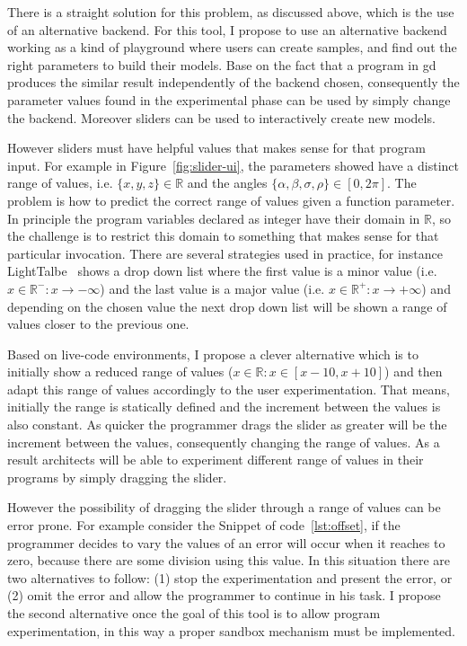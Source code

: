 There is a straight solution for this problem, as discussed above, which is the use of an alternative backend. For this tool, I propose to use an alternative backend working as a kind of playground where users can create samples, and find out the right parameters to build their models. Base on the fact that a program in \gls{gd} produces the similar result independently of the backend chosen, consequently the parameter values found in the experimental phase can be used by simply change the backend. Moreover sliders can be used to interactively create new models.

However sliders must have helpful values that makes sense for that program input. For example in Figure~\ref{fig:slider-ui}, the parameters showed have a distinct range of values, i.e. $\{x,y,z\} \in \mathds{R}$ and the angles $\{\alpha,\beta, \sigma, \rho \} \in [0, 2 \pi]$. The problem is how to predict the correct range of values given a function parameter. In principle the program variables declared as integer have their domain in $\mathds{R}$, so the challenge is to restrict this domain to something that makes sense for that particular invocation. There are several strategies used in practice, for instance LightTalbe~\citep{lighttable} shows a drop down list where the first value is a minor value (i.e. $x \in \mathds{R}^- : x \rightarrow - \infty$) and the last value is a major value (i.e. $x \in \mathds{R}^+ : x \rightarrow + \infty$) and depending on the chosen value the next drop down list will be shown a range of values closer to the previous one.

Based on  live-code environments, I propose a clever alternative which is to initially show a reduced range of values ($x \in \mathds{R} : x \in [x-10, x+10]$) and then adapt this range of values accordingly to the user experimentation. That means, initially the range is statically defined and the increment between the values is also constant. As quicker the programmer drags the slider as greater will be the increment between the values, consequently changing the range of values. As a result architects will be able to experiment different range of values in their programs by simply dragging the slider.

However the possibility of dragging the slider through a range of values can be error prone. For example consider the Snippet of code~\ref{lst:offset}, if the programmer decides to vary the values of  an error will occur when it reaches to zero, because there are some division using this value. In this situation there are two alternatives to follow: (1) stop the experimentation and present the error, or (2) omit the error and allow the programmer to continue in his task. I propose the second alternative once the goal of this tool is to allow program experimentation, in this way a proper sandbox mechanism must be implemented.

